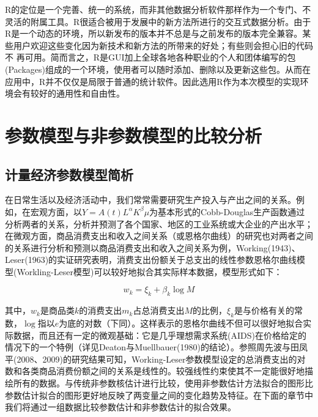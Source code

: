 \documentclass[12pt,a4paper,openany,twoside]{book}
\numberwithin{figure}{chapter}
\numberwithin{table}{chapter}
\numberwithin{equation}{chapter}
\begin{document}
R的定位是一个完善、统一的系统，而非其他数据分析软件那样作为一个专门、不灵活的附属工具。R很适合被用于发展中的新方法所进行的交互式数据分析。由于R是一个动态的环境，所以新发布的版本并不总是与之前发布的版本完全兼容。某些用户欢迎这些变化因为新技术和新方法的所带来的好处；有些则会担心旧的代码不
再可用。简而言之，R是GUI加上全球各地各种职业的个人和团体编写的包(Packages)组成的一个环境，使用者可以随时添加、删除以及更新这些包。从而在应用中，R并不仅仅是局限于普通的统计软件。因此选用R作为本次模型的实现环境会有较好的通用性和自由性。

\newpage{}


\section{参数模型与非参数模型的比较分析}


\subsection{计量经济参数模型简析}

在日常生活以及经济活动中，我们常常需要研究生产投入与产出之间的关系。例如，在宏观方面，以$Y=A(t)L^{\alpha}K^{\beta}\mu$为基本形式的Cobb-Douglas生产函数通过分析两者的关系，分析并预测了各个国家、地区的工业系统或大企业的产出水平；在微观方面，商品消费支出和收入之间关系（或恩格尔曲线）的研究也对两者之间的关系进行分析和预测以商品消费支出和收入之间关系为例，Working(1943)\cite{working1943statistical}、Leser(1963)\cite{leser1963forms}的实证研究表明，消费支出份额关于总支出的线性参数恩格尔曲线模型(Workling-Leser模型)可以较好地拟合其实际样本数据，模型形式如下：

\begin{equation}
w_{k}=\xi_{k}+\beta_{k}\log M
\end{equation}


其中，$w_{k}$是商品类$k$的消费支出$m_{k}$占总消费支出$M$的比例，$\xi_{k}$是与价格有关的常数，$\log$指以$e$为底的对数（下同）。这样表示的恩格尔曲线不但可以很好地拟合实际数据，而且还有一定的微观基础：它是几乎理想需求系统(AIDS)在价格给定的情况下的一个特例（详见Deaton与Muellbauer(1980)\cite{deaton1980almost}的结论）。参照周先波与田凤平(2008、2009)\cite{zxb2009,zxb20081}的研究结果可知，Working-Leser参数模型设定的总消费支出的对数和各类商品消费份额之间的关系是线性的。较强线性约束使其不一定能很好地描绘所有的数据。与传统非参数核估计进行比较，使用非参数估计方法拟合的图形比参数估计拟合的图形更好地反映了两变量之间的变化趋势及特征。在下面的章节中我们将通过一组数据比较参数估计和非参数估计的拟合效果。
\end{document}
